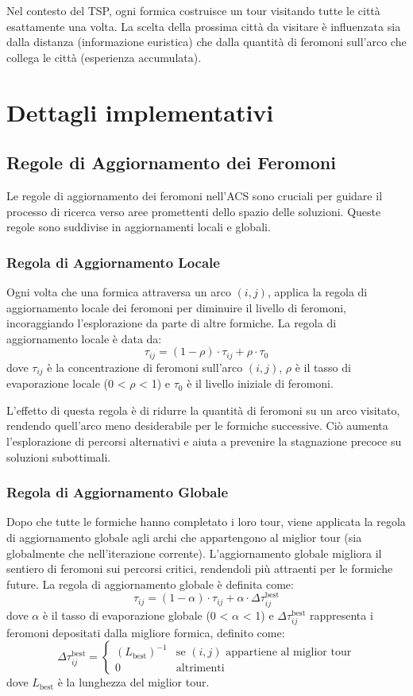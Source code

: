 Nel contesto del \Gls{TSP}, ogni formica costruisce un tour visitando tutte le città esattamente una volta. La scelta della prossima città da visitare è influenzata sia dalla distanza (informazione euristica) che dalla quantità di feromoni sull'arco che collega le città (esperienza accumulata).

\section{Dettagli implementativi}

\subsection{Regole di Aggiornamento dei Feromoni}

Le regole di aggiornamento dei feromoni nell'\Gls{ACS} sono cruciali per guidare il processo di ricerca verso aree promettenti dello spazio delle soluzioni. Queste regole sono suddivise in aggiornamenti locali e globali.

\subsubsection{Regola di Aggiornamento Locale}
Ogni volta che una formica attraversa un arco $(i,j)$, applica la regola di aggiornamento locale dei feromoni per diminuire il livello di feromoni, incoraggiando l'esplorazione da parte di altre formiche. La regola di aggiornamento locale è data da:
\[
	\tau_{ij} = (1 - \rho) \cdot \tau_{ij} + \rho \cdot \tau_0
\]
dove $\tau_{ij}$ è la concentrazione di feromoni sull'arco $(i,j)$, $\rho$ è il tasso di evaporazione locale (0 < $\rho$ < 1) e $\tau_0$ è il livello iniziale di feromoni.

L'effetto di questa regola è di ridurre la quantità di feromoni su un arco visitato, rendendo quell'arco meno desiderabile per le formiche successive. Ciò aumenta l'esplorazione di percorsi alternativi e aiuta a prevenire la stagnazione precoce su soluzioni subottimali.

\subsubsection{Regola di Aggiornamento Globale}
Dopo che tutte le formiche hanno completato i loro tour, viene applicata la regola di aggiornamento globale agli archi che appartengono al miglior tour (sia globalmente che nell'iterazione corrente). L'aggiornamento globale migliora il sentiero di feromoni sui percorsi critici, rendendoli più attraenti per le formiche future. La regola di aggiornamento globale è definita come:
\[
	\tau_{ij} = (1 - \alpha) \cdot \tau_{ij} + \alpha \cdot \Delta \tau_{ij}^{\text{best}}
\]
dove $\alpha$ è il tasso di evaporazione globale (0 < $\alpha$ < 1) e $\Delta \tau_{ij}^{\text{best}}$ rappresenta i feromoni depositati dalla migliore formica, definito come:
\[
	\Delta \tau_{ij}^{\text{best}} = \begin{cases}
		(L_{\text{best}})^{-1} & \text{se }(i,j)\text{ appartiene al miglior tour} \\
		0                      & \text{altrimenti}
	\end{cases}
\]
dove $L_{\text{best}}$ è la lunghezza del miglior tour.

